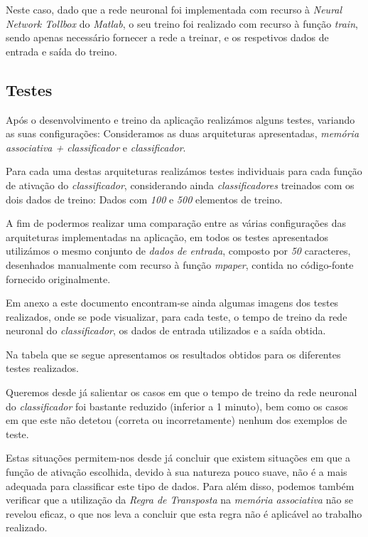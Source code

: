 \documentclass{article}
\begin{document}
Neste caso, dado que a rede neuronal foi implementada com recurso à \emph{Neural Network Tollbox} do \emph{Matlab}, o seu treino foi realizado com recurso à função \emph{train}, sendo apenas necessário fornecer a rede a treinar, e os respetivos dados de entrada e saída do treino.

\subsection{Testes}

Após o desenvolvimento e treino da aplicação realizámos alguns testes, variando as suas configurações: Consideramos as duas arquiteturas apresentadas,  \emph{memória associativa + classificador} e \emph{classificador}.

Para cada uma destas arquiteturas realizámos testes individuais para cada função de ativação do \emph{classificador}, considerando ainda \emph{classificadores} treinados com os dois dados de treino: Dados com \emph{100} e \emph{500} elementos de treino.

A fim de podermos realizar uma comparação entre as várias configurações das arquiteturas implementadas na aplicação, em todos os testes apresentados utilizámos o mesmo conjunto de \emph{dados de entrada}, composto por \emph{50} caracteres, desenhados manualmente com recurso à função \emph{mpaper}, contida no código-fonte fornecido originalmente.

Em anexo a este documento encontram-se ainda algumas imagens dos testes realizados, onde se pode visualizar, para cada teste, o tempo de treino da rede neuronal do \emph{classificador}, os dados de entrada utilizados e a saída obtida.

Na tabela que se segue apresentamos os resultados obtidos para os diferentes testes realizados.

Queremos desde já salientar os casos em que o tempo de treino da rede neuronal do \emph{classificador} foi bastante reduzido (inferior a 1 minuto), bem como os casos em que este não detetou (correta ou incorretamente) nenhum dos exemplos de teste. 

Estas situações permitem-nos desde já concluir que existem situações em que a função de ativação escolhida, devido à sua natureza pouco suave, não é a mais adequada para classificar este tipo de dados. Para além disso, podemos também verificar que a utilização da \emph{Regra de Transposta} na \emph{memória associativa} não se revelou eficaz, o que nos leva a concluir que esta regra não é aplicável ao trabalho realizado.
\end{document}
